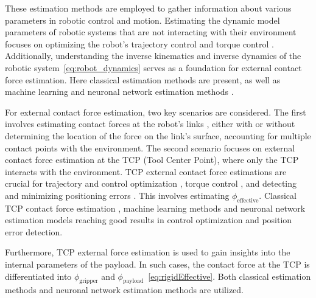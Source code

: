     These estimation methods are employed to gather information about various parameters in robotic control and motion. Estimating the dynamic model parameters of robotic systems that are not interacting with their environment focuses on optimizing the robot's trajectory control \cite{lee2020adaptive} and torque control \cite{nguyen2008learning}. Additionally, understanding the inverse kinematics \cite{ren2020learning} and inverse dynamics \cite{leon2022parameter, golluccio2021robot} of the robotic system~\eqref{eq:robot_dynamics} serves as a foundation for external contact force estimation. Here classical estimation methods are present\cite{dong2023dynamic, golluccio2021robot, deng2021dynamic}, as well as machine learning \cite{nguyen2008learning} and neuronal network estimation methods \cite{leon2022parameter,urrea2018parameter}.

    For external contact force estimation, two key scenarios are considered. The first involves estimating contact forces at the robot's links \cite{Popov2019, su2021deep}, either with \cite{Popov2019} or without \cite{su2021deep} determining the location of the force on the link's surface, accounting for multiple contact points with the environment. The second scenario focuses on external contact force estimation at the TCP (Tool Center Point), where only the TCP interacts with the environment. TCP external contact force estimations are crucial for trajectory and control optimization \cite{HANINGER2023104431, haninger2022model}, torque control \cite{motor_current_estimation}, and detecting and minimizing positioning errors \cite{Tan2023, lu2023external}. This involves estimating \(\phi_{\text{effective}}\). Classical TCP contact force estimation \cite{motor_current_estimation}, machine learning methods \cite{HANINGER2023104431, haninger2022model, beckers2017stable, berger2015learning,blumberg2023estimation} and neuronal network estimation models \cite{Tan2023, lu2023external, Kruzic2021, shan2024fine, berger2016estimating, liu2021sensorless, su2021deep} reaching good results in control optimization and position error detection. 
    
    Furthermore, TCP external force estimation is used to gain insights into the internal parameters of the payload. In such cases, the contact force at the TCP is differentiated into \(\phi_{\text{gripper}}\) and \(\phi_{\text{payload}}\)~\eqref{eq:rigidEffective}. Both classical estimation methods \cite{Hu2020, Xu2022accurate, kurdas2022online, nadeau2022fast} and neuronal network estimation methods \cite{berger2021feature} are utilized. 

